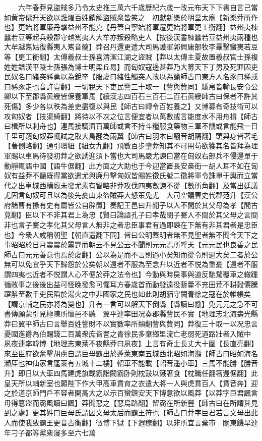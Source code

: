　　六年春莽見盜賊多乃令太史推三萬六千歲歷紀六歲一改元布天下下書自言己當如黄帝僊升天欲以誑燿百姓銷解盜賊衆皆笑之　初獻新樂於明堂太廟【新樂莽所作也】更始將軍廉丹擊益州不能克【丹蓋自寧始將軍遷更始將軍更工衡翻】益州夷棟蠶若豆等起兵殺郡守越嶲夷人大牟亦叛殺略吏人【按後漢書棟蠶若豆益州夷兩種也大牟越嶲姑復縣夷人嶲音髓】莽召丹還更遣大司馬護軍郭興庸部牧李曅擊蠻夷若豆等【更工衡翻】太傅羲叔士孫喜清潔江湖之盜賊【莽以太傅主夏故置羲叔官士孫複姓姓譜漢平陵士孫張為博士明梁丘易】而匈奴寇邊甚莽乃大募天下丁男及死罪囚吏民奴名曰豬突豨勇以為銳卒【服䖍曰豬性觸突人故以為諭師古曰東方人名豕曰豨或曰豨豕走也音許豈翻】一切稅天下吏民訾三十取一【訾與貲同】縑帛皆輸長安令公卿以下至郡縣黄綬皆保養軍馬【續漢志四百石三百石二百石黄綬師古曰保者不許其死傷】多少各以秩為差吏盡復以與民【師古曰轉令百姓養之】又博募有奇技術可以攻匈奴者【技渠綺翻】將待以不次之位言便宜者以萬數或言能度水不用舟楫【師古曰楫所以刺舟也】連馬接騎濟百萬師或言不持斗糧服食藥物三軍不饑或言能飛一日千里可窺匈奴莽輒試之取大鳥翮為兩翼【師古曰羽本曰翮音胡隔翻】頭與身皆著毛【著側略翻】通引環紐【紐女九翻】飛數百步墮莽知其不可用苟欲獲其名皆拜為理軍賜以車馬待發初莽之欲誘迎須卜當也大司馬嚴尤諫曰當在匈奴右部兵不侵邊單于動靜輒語中國【語牛倨翻】此方面之大助也于今迎當置長安槀街一胡人耳不如在匈奴有益莽不聽既得當欲遣尤與廉丹擊匈奴皆賜姓徵氏號二徵將軍令誅單于輿而立當代之出車城西横廐未發尤素有智略非莽攻伐四夷數諫不從【數所角翻】及當出廷議尤固言匈奴可且以為後先憂山東盜賊莽大怒策免尤　大司空議曹史代郡范升【漢公府諸曹有掾有史有屬皆公自辟置】奏記王邑曰升聞子以人不間於其父母為孝【間古莧翻】臣以下不非其君上為忠【賢曰論語孔子曰孝哉閔子騫人不間於其父母之言間非也言子騫之孝化其父母言人無非之者忠臣事君有過即諫在下無有非其君者是忠臣也】今衆人咸稱朝聖【朝直遥翻下同】皆曰公明蓋明者無不見聖者無不聞今天下之事昭昭於日月震震於靁霆而朝云不見公云不聞則元元焉所呼天【元元民也良善之民師古曰元元善意也焉於䖍翻】公以為是而不言則過小矣知而從令則過大矣二者於公無可以免宜乎天下歸怨於公矣朝以遠者不服為至念升以近者不悦為重憂【遠者不服謂四夷也近者不悦謂人心不便於莽之法令也】今動與時戾事與道反馳騖覆車之轍踵循敗事之後後出益可怪晚發愈可懼耳方春歲首而動發遠役藜藿不充田荒不耕穀價騰躍斛至數千吏民䧟於湯火之中非國家之民也如此則胡貊守闕青徐之寇在於帷帳矣【謂京輔之民亦將為變也】升有一言可以解天下倒縣【縣讀曰懸】免元元之急不可書傳願蒙引見極陳所懷邑不聽　翼平連率田况奏郡縣訾民不實【地理志北海壽光縣莽曰翼平師古曰言舉百姓訾財不以實數率所類翻訾與貲同】莽復三十取一以况忠言憂國進爵為伯賜錢二百萬衆庶皆詈之青徐民多棄鄉里流亡老弱死道路壯者入賊中　夙夜連率韓博【地理志東萊不夜縣莽曰夙夜】上言有奇士長丈大十圍【長直亮翻】來至臣府欲奮擊胡虜自謂巨毋霸出於蓬萊東南五城西北昭如海瀕【師古曰昭如海名瀕厓也神仙家言蓬萊有五城十二樓】軺車不能載【軺音遥小車】三馬不能勝【勝音升】即日以大車四馬建虎旗載霸詣闕霸卧則枕鼓以鐵箸食【枕職任翻箸遟倨翻】此皇天所以輔新室也願陛下作大甲高車賁育之衣遣大將一人與虎賁百人【賁音奔】迎之於道京師門戶不容者開高大之以示百蠻鎮安天下博意欲以風莽【以莽字巨君諷言毋得簒盜而霸風讀曰諷】莽聞惡之【惡烏路翻】留霸在所新豐【師古曰在所謂其見到之處】更其姓曰巨母氏謂因文母太后而霸王符也【師古曰莽字巨君若言文母出此人而使我致霸王更音古衡翻】徵博下獄【下遐稼翻】以非所宜言棄市　關東饑旱連年刁子都等黨衆寖多至六七萬

